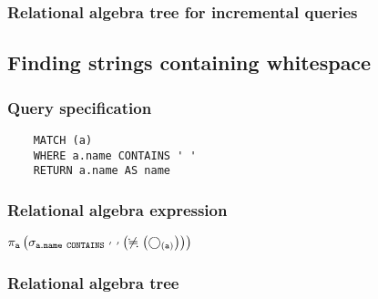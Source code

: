 	\subsubsection*{Relational algebra tree for incremental queries}

	\subsection{Finding strings containing whitespace}

	\subsubsection*{Query specification}

	\begin{lstlisting}
	MATCH (a)
	WHERE a.name CONTAINS ' '
	RETURN a.name AS name
	\end{lstlisting}


	\subsubsection*{Relational algebra expression}

	$\projection{\var{a}} \left(\selection{\mathtt{a.name~CONTAINS~'~'}} \left(\alldifferent{} \left(\getvertices{a}{}\right)\right)\right)$

	\subsubsection*{Relational algebra tree}


